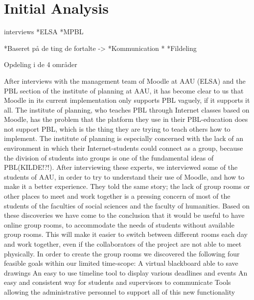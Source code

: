 \section{Initial Analysis}
\begin{comment}
In the preliminary phase of working with Electronic-learning (E-learning) it is important for us to ensure that we are in fact working with problems that are relevant in the E-learning and Problem Based Learning (PBL) fields of study, as we are aiming at improving the overall way that the chosen E-learning environment at Aalborg University (AAU), namely Moodle, supports PBL. Because AAU is renowned for its implementation of PBL, we do not have to look very far to find some of the leading experts in this field.
\end{comment}

interviews
*ELSA
*MPBL

*Baseret på de ting de fortalte ->
*Kommunication
* 
*Fildeling

Opdeling i de 4 områder

After interviews with the management team of Moodle at AAU (ELSA) and the PBL section of the institute of planning at AAU, it has become clear to us that Moodle in its current implementation only supports PBL vaguely, if it supports it all. The institute of planning, who teaches PBL through Internet classes based on Moodle, has the problem that the platform they use in their PBL-education does not support PBL, which is the thing they are trying to teach others how to implement. The institute of planning is especially concerned with the lack of an environment in which their Internet-students could connect as a group, because the division of students into groups is one of the fundamental ideas of PBL(KILDE!?!). After interviewing these experts, we interviewed some of the students of AAU, in order to try to understand their use of Moodle, and how to make it a better experience. They told the same story; the lack of group rooms or other places to meet and work together is a pressing concern of most of the students of the faculties of social sciences and the faculty of humanities. Based on these discoveries we have come to the conclusion that it would be useful to have online group rooms, to accommodate the needs of students without available group rooms. This will make it easier to switch between different rooms each day and work together, even if the collaborators of the project are not able to meet physically.
In order to create the group rooms we discovered the following four feasible goals within our limited time-scope:
A virtual blackboard able to save drawings
An easy to use timeline tool to display various deadlines and events
An easy and consistent way for students and supervisors to communicate
Tools allowing the administrative personnel to support all of this new functionality

